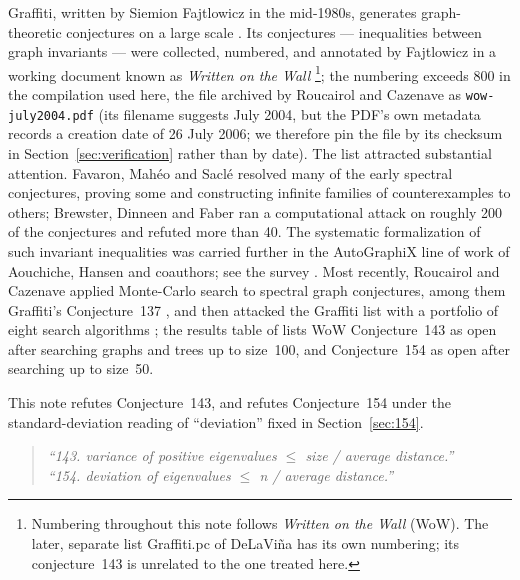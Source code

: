\documentclass[11pt]{article}
\theoremstyle{remark}
\begin{document}
Graffiti, written by Siemion Fajtlowicz in the mid-1980s, generates
graph-theoretic conjectures on a large scale
\cite{Fajtlowicz1988,DeLaVina2005}. Its conjectures --- inequalities between
graph invariants --- were collected, numbered, and annotated by Fajtlowicz in
a working document known as \emph{Written on the Wall}
\cite{WOW}\footnote{Numbering throughout this note follows \emph{Written on
the Wall} (WoW). The later, separate list Graffiti.pc of DeLaVi\~na has its
own numbering; its conjecture~143 is unrelated to the one treated here.};
the numbering exceeds 800 in the compilation used here, the file archived by
Roucairol and Cazenave as \texttt{wow-july2004.pdf} (its filename suggests
July 2004, but the PDF's own metadata records a creation date of 26 July
2006; we therefore pin the file by its checksum in
Section~\ref{sec:verification} rather than by date). The list
attracted substantial attention. Favaron, Mah\'eo and Sacl\'e
\cite{FMS1993} resolved many of the early spectral conjectures, proving some
and constructing infinite families of counterexamples to others; Brewster,
Dinneen and Faber \cite{BDF1995} ran a computational attack on roughly 200 of
the conjectures and refuted more than 40. The systematic formalization of
such invariant inequalities was carried further in the AutoGraphiX line of
work of Aouchiche, Hansen and coauthors; see the survey \cite{AouchicheHansen2010}.
Most recently, Roucairol and Cazenave applied Monte-Carlo search to spectral
graph conjectures, among them Graffiti's Conjecture~137
\cite{RoucairolCazenave2022}, and then attacked the Graffiti list with a
portfolio of eight search algorithms
\cite{RoucairolCazenave2025}; the results table of
\cite{RoucairolCazenave2025} lists WoW Conjecture~143 as open after searching
graphs and trees up to size~100, and Conjecture~154 as open after searching up
to size~50.

This note refutes Conjecture~143, and refutes Conjecture~154 under the
standard-deviation reading of ``deviation'' fixed in
Section~\ref{sec:154}.

\begin{quote}
\emph{``143. variance of positive eigenvalues $\le$ size / average
distance.''}\\[2pt]
\emph{``154. deviation of eigenvalues $\le$ n / average distance.''}
\end{quote}
\end{document}
